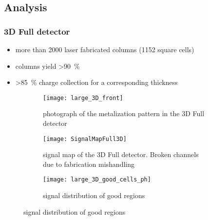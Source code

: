 \subsection{Analysis}
\begin{frame}
  \frametitle{3D Full detector}
  \begin{itemize}
	\setlength{\itemsep}{\fill}
    \item more than 2000 laser fabricated columns (1152 square cells)    
    \item columns yield \SI{>90}{\%}
    \item \SI{>85}{\%} charge collection for a corresponding thickness
  \end{itemize}
  \begin{figure}[c]
    \centering
    \begin{subfigure}[t]{0.3\textwidth}
      \texttt{[image: large\_3D\_front]}
      \caption{photograph of the metalization pattern in the 3D Full detector}
      \label{fig:3DMetal}
    \end{subfigure}
    \begin{subfigure}[t]{0.3\textwidth}
      \texttt{[image: SignalMapFull3D]}
      \caption{signal map of the 3D Full detector. Broken channels due to fabrication mishandling}
      \label{fig:3dSignalMap}
    \end{subfigure}
    \begin{subfigure}[t]{0.3\textwidth}
      \texttt{[image: large\_3D\_good\_cells\_ph]}
      \caption{signal distribution of good regions}
      \label{fig:3dhisto}
    \end{subfigure}
  \end{figure}
\end{frame}


